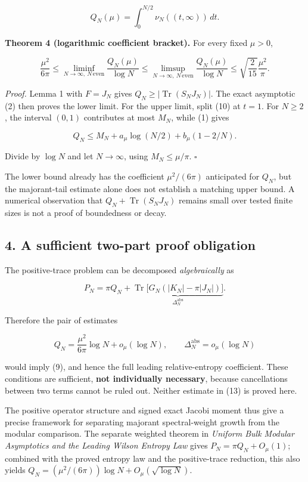 \documentclass[
  10pt,
  a4paper,
]{article}
\begin{document}
\[
Q_N(\mu)=\int_0^{N/2}\nu_N((t,\infty))\,dt.
\tag{10}
\]

\textbf{Theorem 4 (logarithmic coefficient bracket).} For every fixed \(\mu>0\),

\[
\boxed{\frac{\mu^2}{6\pi}\le
\liminf_{N\to\infty,\ N\,\mathrm{even}}\frac{Q_N(\mu)}{\log N}\le
\limsup_{N\to\infty,\ N\,\mathrm{even}}\frac{Q_N(\mu)}{\log N}\le
\sqrt{\frac2{15}}\frac{\mu^2}{\pi}.}
\tag{11}
\]

\emph{Proof.} Lemma 1 with \(F=J_N\) gives \(Q_N\ge|\operatorname{Tr}(S_NJ_N)|\). The exact asymptotic (2) then proves the lower limit. For the upper limit, split (10) at \(t=1\). For \(N\ge2\), the interval \((0,1)\) contributes at most \(M_N\), while (1) gives

\[
Q_N\le M_N+a_\mu\log(N/2)+b_\mu(1-2/N).
\]

Divide by \(\log N\) and let \(N\to\infty\), using \(M_N\le\mu/\pi\). \(\square\)

The lower bound already has the coefficient \(\mu^2/(6\pi)\) anticipated for \(Q_N\), but the majorant-tail estimate alone does not establish a matching upper bound. A numerical observation that \(Q_N+\operatorname{Tr}(S_NJ_N)\) remains small over tested finite sizes is not a proof of boundedness or decay.

\subsection{4. A sufficient two-part proof obligation}\label{a-sufficient-two-part-proof-obligation}

The positive-trace problem can be decomposed \emph{algebraically} as

\[
P_N=\pi Q_N + \underbrace{\operatorname{Tr}\bigl[G_N(|K_N|-\pi|J_N|)\bigr]}_{\Delta_N^{\mathrm{abs}}}.
\tag{12}
\]

Therefore the pair of estimates

\[
Q_N=\frac{\mu^2}{6\pi}\log N+o_\mu(\log N),\qquad
\Delta_N^{\mathrm{abs}}=o_\mu(\log N)
\tag{13}
\]

would imply (9), and hence the full leading relative-entropy coefficient. These conditions are sufficient, \textbf{not individually necessary}, because cancellations between two terms cannot be ruled out. Neither estimate in (13) is proved here.

The positive operator structure and signed exact Jacobi moment thus give a precise framework for separating majorant spectral-weight growth from the modular comparison. The separate weighted theorem in \emph{Uniform Bulk Modular Asymptotics and the Leading Wilson Entropy Law} gives \(P_N=\pi Q_N+O_\mu(1)\); combined with the proved entropy law and the positive-trace reduction, this also yields \(Q_N=(\mu^2/(6\pi))\log N+O_\mu(\sqrt{\log N})\).
\end{document}
